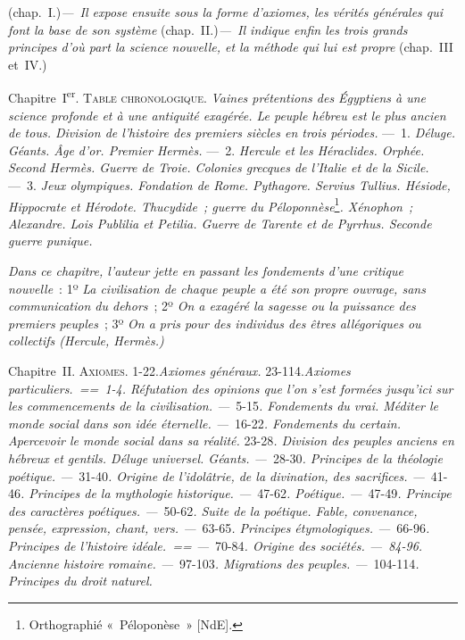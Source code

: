 \documentclass[french,twoside]{book} %
\newcommand\chaptercont{} %
\begin{document}
\chaptercont
{} (chap. I.){\itshape  — Il expose ensuite sous la forme d’axiomes, les vérités générales qui font la base de son système} (chap. II.){\itshape  — Il indique enfin les trois grands principes d’où part la science nouvelle, et la méthode qui lui est propre} (chap. III et IV.)\par
\par
 Chapitre I\textsuperscript{er}. {\scshape Table chronologique.} {\itshape Vaines prétentions des Égyptiens à une science profonde et à une antiquité exagérée. Le peuple hébreu est le plus ancien de tous. Division de l’histoire des premiers siècles en trois périodes.} — 1. {\itshape Déluge. Géants. Âge d’or. Premier Hermès.} — 2. {\itshape Hercule et les Héraclides. Orphée. Second Hermès. Guerre de Troie. Colonies grecques de l’Italie et de la Sicile.} — 3. {\itshape Jeux olympiques. Fondation de Rome. Pythagore. Servius Tullius. Hésiode, Hippocrate et Hérodote. Thucydide ; guerre du Péloponnèse}\footnote{Orthographié « Péloponèse » [NdE].}{\itshape . Xénophon ; Alexandre. Lois Publilia et Petilia. Guerre de Tarente et de Pyrrhus. Seconde guerre punique.}\par
{\itshape Dans ce chapitre, l’auteur jette en passant les fondements d’une critique nouvelle} : 1º {\itshape La civilisation de chaque peuple a été son propre ouvrage, sans communication du dehors} ; 2º {\itshape On a exagéré la sagesse ou la puissance des premiers peuples} ; 3º {\itshape On a pris pour des individus des êtres allégoriques ou collectifs (Hercule, Hermès.)}\par
\par
Chapitre {\scshape II. Axiomes}. 1-22.{\itshape  Axiomes généraux.} 23-114.{\itshape  Axiomes particuliers. == 1-4. Réfutation des opinions que l’on s’est formées jusqu’ici sur les commencements de la civilisation. —} 5-15{\itshape . Fondements du vrai. Méditer le monde social dans son idée éternelle. —} 16-22{\itshape . Fondements du certain. Apercevoir le monde social dans sa réalité.} 23-28{\itshape . Division des peuples anciens en hébreux et gentils. Déluge}  {\itshape universel. Géants. —} 28-30{\itshape . Principes de la théologie poétique. —} 31-40{\itshape . Origine de l’idolâtrie, de la divination, des sacrifices. —} 41-46{\itshape . Principes de la mythologie historique. —} 47-62{\itshape . Poétique. —} 47-49{\itshape . Principe des caractères poétiques. —} 50-62{\itshape . Suite de la poétique. Fable, convenance, pensée, expression, chant, vers. —} 63-65{\itshape . Principes étymologiques. —} 66-96{\itshape . Principes de l’histoire idéale. == —} 70-84{\itshape . Origine des sociétés. — 84-96. Ancienne histoire romaine. —} 97-103{\itshape . Migrations des peuples. —} 104-114{\itshape . Principes du droit naturel.}\par
\end{document}
